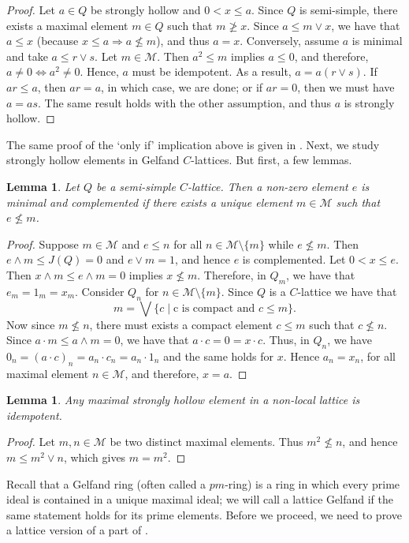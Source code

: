 \documentclass[11pt,english]{amsart}
\newtheorem{lemma}[theorem]{Lemma}
\theoremstyle{definition}
\numberwithin{equation}{section}
\theoremstyle{remark}
\def\leq{\leqslant}
\begin{document}
	\begin{proof}
		Let $a\in Q$ be strongly hollow and $0<x\leq a$. Since $Q$ is semi-simple, there exists a maximal element $m\in Q$ such that $m\ngeq x$. Since $a\leq m\vee x$, we have that $a\leq x$ (because $x\leq a \Rightarrow a \nleq m$), and thus $a=x$. Conversely, assume $a$ is minimal and take $a\leq r \vee s$. Let $m\in\mathcal{M}$. Then $a^2\leq m$ implies $a\leq0$, and therefore, $a\neq0 \Leftrightarrow a^2\neq0$. Hence, $a$ must be idempotent. As a result, $a=a(r\vee s)$. If $ar\leq a$,  then $ar=a$, in which case, we are done; or if $ar=0$, then we must have $a=as$.  The same result holds with the other assumption, and thus $a$ is strongly hollow.
	\end{proof}
	
	The same proof of the `only if' implication above is given in \cite[Lemma~5.6]{Abs-CIT}. 
	Next, we study strongly hollow elements in Gelfand $C$-lattices. But first, a few lemmas.
	
	\begin{lemma}\label{L3.2}
		Let $Q$ be a semi-simple $C$-lattice. Then a non-zero element $e$ is minimal and complemented if there exists a unique element $m\in \mathcal{M}$ such that $e\nleq m$.
	\end{lemma}
	
	\begin{proof}
		Suppose $m\in \mathcal{M}$ and $e\leq n$ for all $n\in \mathcal{M}\setminus\{m\}$ while $e\nleq m$. Then $e\wedge m\leq J(Q)=0$ and $e\vee m=1$, and hence $e$ is complemented. Let \(0<x\leq e\). Then $x\wedge m\leq e\wedge m=0$ implies $x\nleq m$. Therefore, in $Q_m$, we have that $e_m=1_m=x_m$. Consider $Q_n$ for $n\in \mathcal{M}\setminus\{m\}$. Since $Q$ is a $C$-lattice we have that \[m=\bigvee\{c\mid \text{c is compact and }c\leq m\}.\] Now since $m\nleq n$, there must exists a compact element $c\leq m$ such that $c\nleq n$. Since $a\cdot m\leq a\wedge m=0$, we have that $a\cdot c=0=x\cdot c$. Thus, in $Q_n$, we have  $0_n=(a\cdot c)_n=a_n\cdot c_n=a_n\cdot1_n$ and the same holds for $x$. Hence $a_n=x_n$, for all maximal element $n\in \mathcal{M}$, and therefore, $x=a$.
	\end{proof}
	
	\begin{lemma}\label{L3.3}
		Any maximal strongly hollow element in a non-local lattice is idempotent.
	\end{lemma}
	
	\begin{proof}
		Let $m,n\in \mathcal{M}$ be two distinct maximal elements. Thus $m^2\nleq n$, and hence $m\leq m^2\vee n$, which gives $m= m^2$.
	\end{proof}
	Recall that a Gelfand ring (often called a $pm$-ring) is a ring in which every prime ideal is contained in a unique maximal ideal; we will call a lattice Gelfand if the same statement holds for its prime elements. Before we proceed, we need to prove a lattice version of a part of \cite[Theorem 1.2]{DeMarco-Orsatti-1971}.
	
\end{document}
